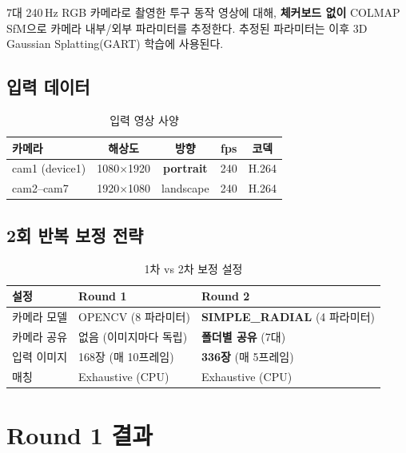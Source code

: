 \documentclass[11pt, a4paper]{report}
\begin{document}
7대 240\,Hz RGB 카메라로 촬영한 투구 동작 영상에 대해,
\textbf{체커보드 없이} COLMAP SfM으로 카메라 내부/외부 파라미터를 추정한다.
추정된 파라미터는 이후 3D Gaussian Splatting(GART) 학습에 사용된다.

\section{입력 데이터}

\begin{table}[H]
\centering
\caption{입력 영상 사양}
\renewcommand{\arraystretch}{1.3}
\begin{tabular}{lcccc}
\toprule
\textbf{카메라} & \textbf{해상도} & \textbf{방향} & \textbf{fps} & \textbf{코덱} \\
\midrule
cam1 (device1) & 1080$\times$1920 & \textbf{portrait} & 240 & H.264 \\
cam2--cam7 & 1920$\times$1080 & landscape & 240 & H.264 \\
\bottomrule
\end{tabular}
\end{table}

\section{2회 반복 보정 전략}

\begin{table}[H]
\centering
\caption{1차 vs 2차 보정 설정}
\renewcommand{\arraystretch}{1.3}
\begin{tabularx}{\textwidth}{lXX}
\toprule
\textbf{설정} & \textbf{Round 1} & \textbf{Round 2} \\
\midrule
카메라 모델 & OPENCV (8 파라미터) & \textbf{SIMPLE\_RADIAL} (4 파라미터) \\
카메라 공유 & 없음 (이미지마다 독립) & \textbf{폴더별 공유} (7대) \\
입력 이미지 & 168장 (매 10프레임) & \textbf{336장} (매 5프레임) \\
매칭 & Exhaustive (CPU) & Exhaustive (CPU) \\
\bottomrule
\end{tabularx}
\end{table}


\chapter{Round 1 결과}
\end{document}
